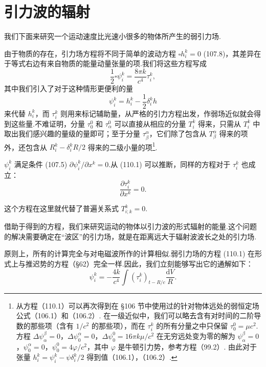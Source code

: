 \section{引力波的辐射}

我们下面来研究一个运动速度比光速小很多的物体所产生的弱引力场.

由于物质的存在，引力场方程将不同于简单的波动方程 $\square h_i^k=0$ (107.8)，其差异在于等式右边有来自物质的能量动量张量的项.我们将这些方程写成
\begin{equation}
  \frac{1}{2}\square\psi_i^k=\frac{8\pi k}{c^{4}}\tau_i^k,
\end{equation}
其中我们引入了对于这种情形更便利的量
\begin{equation*}
  \psi_i^k=h_i^k-\frac{1}{2}\delta_i^kh
\end{equation*}
来代替 $h_i^k$，而 $\tau_i^k$ 则用来标记辅助量，从严格的引力方程出发，作弱场近似就会得到这些量.不难证明，分量 $\tau_0^0$ 和 $\tau_\alpha^0$ 可以直接从相应的分量 $T_i^k$ 得来，只需从 $T_i^k$ 中取出我们感兴趣的量级的量即可；至于分量 $\tau_\beta^\alpha$，它们除了包含从 $T_\beta^\alpha$ 得来的项外，还包含从 $R_i^k-\delta_i^kR/2$ 得来的二级小量的项\footnote{从方程（110.1）可以再次得到在 §106 节中使用过的针对物体远处的弱恒定场公式（106.1）和（106.2）. 在一级近似中，我们可以略去含有对时间的二阶导数的那些项（含有 $1/c^{2}$ 的那些项），而在 $\tau_{i}^{k}$ 的所有分量之中只保留 $\tau_{0}^{0}=\mu c^{2}$. 方程 $\Delta\psi_{\alpha}^{\beta}=0$，$\Delta\psi_{0}^{\alpha}=0$，$\Delta\psi_{0}^{0}=16\pi k\mu/c^{2}$ 在无穷远处变为零的解为 $\psi_{\alpha}^{\beta}=0$，$\psi_{0}^{\alpha}=0$，$\psi_{0}^{0}=4\varphi/c^{2}$，其中 $\varphi$ 是牛顿引力势，参考方程（99.2）. 由此对于张量 $h_{i}^{k}=\psi_{i}^{k}-\psi\delta_{i}^{k}/2$ 得到值（106.1），（106.2）.}.

$\psi_i^k$ 满足条件 (107.5) $\partial\psi_i^k/\partial x^k=0$.从 (110.1) 可以推断，同样的方程对于 $\tau_i^k$ 也成立：
\begin{equation}
  \frac{\partial\tau_i^k}{\partial x^{k}}=0.
\end{equation}

这个方程在这里就代替了普遍关系式 $T_{i;k}^k=0$.

借助于得到的方程，我们来研究运动的物体以引力波的形式辐射的能量.这个问题的解决需要确定在“波区”的引力场，就是在距离远大于辐射波波长之处的引力场.

原则上，所有的计算完全与对电磁波所作的计算相似.弱引力场的方程 (110.1) 在形式上与推迟势的方程（§62）完全一样.因此，我们立刻能够写出它的通解如下：
\begin{equation}
  \psi_i^k=-\frac{4k}{c^{4}}\int(\tau_i^k)_{t-R/c}
  \frac{\mathrm{d}V}{R}.
\end{equation}

